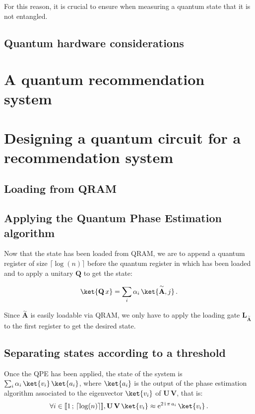 \documentclass[11pt, a4paper]{article}
\begin{document}
                For this reason, it is crucial to ensure when measuring a quantum state that it is not entangled.
        \subsection{Quantum hardware considerations}
            
    \section{A quantum recommendation system}
    \section{Designing a quantum circuit for a recommendation system}
        \subsection{Loading from QRAM}
        \subsection{Applying the Quantum Phase Estimation algorithm}
            Now that the state  has been loaded from QRAM, we are to append a quantum register of size \(\lceil\log(n)\rceil\) before the quantum register in which  has been loaded and to apply a unitary \(\mathbf{Q}\) to get the state:
            
            \[\ket{\mathbf{Q}\,x}=\sum_i\alpha_i\,\ket{\overset{\sim}{\mathbf{A}}, j}\,.\]
            
            Since \(\overset{\sim}{\mathbf{A}}\) is easily loadable via QRAM, we only have to apply the loading gate \(\mathbf{L}_{\overset{\sim}{\mathbf{A}}}\) to the first register to get the desired state.
            
        \subsection{Separating states according to a threshold}
            Once the QPE has been applied, the state of the system is \(\sum_i\alpha_i\,\ket{v_i}\,\ket{a_i}\), where \(\ket{a_i}\) is the output of the phase estimation algorithm associated to the eigenvector \(\ket{v_i}\) of \(\mathbf{U}\,\mathbf{V}\), that is:
            \[\forall i\in\llbracket1\,;\,\lceil\log(n)\rceil\rrbracket,\mathbf{U}\,\mathbf{V}\,\ket{v_i}\approx\mathrm{e}^{2\,\mathrm{i}\,\pi\,a_i}\,\ket{v_i}\,.\]
            
\end{document}
